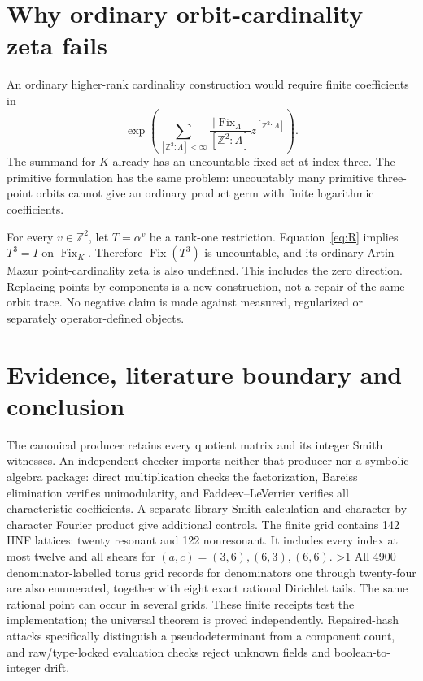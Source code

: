 \documentclass[10pt]{article}
\newcommand{\Z}{\mathbb Z}
\newcommand{\Fix}{\operatorname{Fix}}
\begin{document}
\section{Why ordinary orbit-cardinality zeta fails}\label{sec:zeta}
An ordinary higher-rank cardinality construction would require finite
coefficients in
\begin{equation}\label{eq:zeta}
 \exp\left(\sum_{[\Z^2:\Lambda]<\infty}
 \frac{|\Fix_\Lambda|}{[\Z^2:\Lambda]}
 z^{[\Z^2:\Lambda]}\right).
\end{equation}
The summand for $K$ already has an uncountable fixed set at index three.
The primitive formulation has the same problem: uncountably many
primitive three-point orbits cannot give an ordinary product germ with
finite logarithmic coefficients.

For every $v\in\Z^2$, let $T=\alpha^v$ be a rank-one restriction.
Equation~\eqref{eq:R} implies $T^3=I$ on $\Fix_K$. Therefore
$\Fix(T^3)$ is uncountable, and its ordinary Artin--Mazur point-cardinality
zeta is also undefined. This includes the zero direction. Replacing points
by components is a new construction, not a repair of the same orbit trace.
No negative claim is made against measured, regularized or separately
operator-defined objects.
\fi

\section{Evidence, literature boundary and conclusion}
The canonical producer retains every quotient matrix and its integer Smith
witnesses. An independent checker imports neither that producer nor a
symbolic algebra package: direct multiplication checks the factorization,
Bareiss elimination verifies unimodularity, and Faddeev--LeVerrier verifies
all characteristic coefficients. A separate library Smith calculation and
character-by-character Fourier product give additional controls.
The finite grid contains 142 HNF lattices: twenty resonant and 122
nonresonant. It includes every index at most twelve and all shears for
$(a,c)=(3,6),(6,3),(6,6)$.
\ifnum\CRevisionRound>1
All 4900 denominator-labelled torus grid records for denominators one
through twenty-four are also enumerated, together with eight exact rational
Dirichlet tails. The same rational point can occur in several grids.
\fi
These finite receipts test the implementation; the universal theorem is
proved independently. Repaired-hash attacks specifically distinguish a
pseudodeterminant from a component count, and raw/type-locked evaluation
checks reject unknown fields and boolean-to-integer drift.
\end{document}
